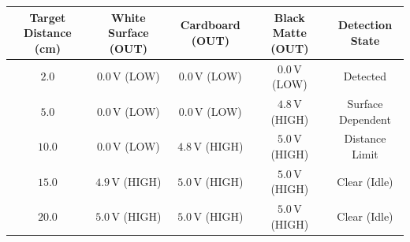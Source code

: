 \begin{observationtable}
\begin{center}
\begin{tabular}{ccccc}
\toprule
\textbf{Target Distance (cm)} & \textbf{White Surface (OUT)} & \textbf{Cardboard (OUT)} & \textbf{Black Matte (OUT)} & \textbf{Detection State} \\
\midrule
$2.0$ & $0.0\,\mathrm{V}$ (LOW) & $0.0\,\mathrm{V}$ (LOW) & $0.0\,\mathrm{V}$ (LOW) & Detected \\
$5.0$ & $0.0\,\mathrm{V}$ (LOW) & $0.0\,\mathrm{V}$ (LOW) & $4.8\,\mathrm{V}$ (HIGH) & Surface Dependent \\
$10.0$ & $0.0\,\mathrm{V}$ (LOW) & $4.8\,\mathrm{V}$ (HIGH) & $5.0\,\mathrm{V}$ (HIGH) & Distance Limit \\
$15.0$ & $4.9\,\mathrm{V}$ (HIGH) & $5.0\,\mathrm{V}$ (HIGH) & $5.0\,\mathrm{V}$ (HIGH) & Clear (Idle) \\
$20.0$ & $5.0\,\mathrm{V}$ (HIGH) & $5.0\,\mathrm{V}$ (HIGH) & $5.0\,\mathrm{V}$ (HIGH) & Clear (Idle) \\
\bottomrule
\end{tabular}
\end{center}
\end{observationtable}

